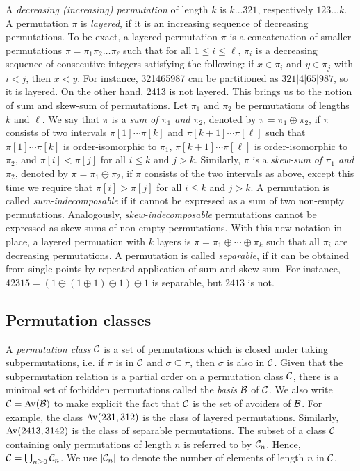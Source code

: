 \documentclass[12pt, a4paper, twoside]{report}
\begin{document}
A \emph{decreasing (increasing) permutation} of length $k$ is $k\ldots321$, respectively $123\ldots k$. A permutation $\pi$ is \emph{layered}, if it is an increasing sequence of decreasing permutations. To be exact, a layered permutation $\pi$ is a concatenation of smaller permutations $\pi= \pi_1\pi_2\ldots\pi_\ell$ such that for all $1 \leq i \leq \ell$, $\pi_i$ is a decreasing sequence of consecutive integers satisfying the following: if $x \in \pi_i$ and $y \in \pi_j$ with $i<j$, then $x<y$. For instance, 321465987 can be partitioned as $321|4|65|987$, so it is layered. On the other hand, 2413 is not layered. This brings us to the notion of sum and skew-sum of permutations. Let $\pi_1$ and $\pi_2$ be permutations of lengths $k$ and $\ell$. We say that $\pi$ is a \emph{sum of $\pi_1$ and $\pi_2$}, denoted by $\pi = \pi_1\oplus\pi_2$, if $\pi$ consists of two intervals $\pi[1]\cdots\pi[k]$ and $\pi[k+1]\cdots\pi[\ell]$ such that $\pi[1]\cdots\pi[k]$ is order-isomorphic to $\pi_1$, $\pi[k+1]\cdots\pi[\ell]$ is order-isomorphic to $\pi_2$, and $\pi[i] < \pi[j]$ for all $i\leq k$ and $j>k$. Similarly, $\pi$ is a \emph{skew-sum of $\pi_1$ and $\pi_2$}, denoted by $\pi = \pi_1\ominus \pi_2$, if $\pi$ consists of the two intervals as above, except this time we require that $\pi[i] > \pi[j]$ for all $i\leq k$ and $j > k$. A permutation is called \emph{sum-indecomposable} if it cannot be expressed as a sum of two non-empty permutations. Analogously, \emph{skew-indecomposable} permutations cannot be expressed as skew sums of non-empty permutations. With this new notation in place, a layered permuation with $k$ layers is $\pi = \pi_1\oplus\cdots\oplus \pi_k$ such that all $\pi_i$ are decreasing permutations. A permutation is called \emph{separable}, if it can be obtained from single points by repeated application of sum and skew-sum. For instance, $42315=(1\ominus (1\oplus 1)\ominus 1)\oplus 1$ is separable, but $2413$ is not.

\subsection{Permutation classes}
A \emph{permutation class} $\mathcal{C}$ is a set of permutations which is closed under taking subpermutations, i.e. if $\pi$ is in $\mathcal{C}$ and $\sigma \subseteq \pi$, then $\sigma$ is also in $\mathcal{C}$. Given that the subpermutation relation is a partial order on a permutation class $\mathcal{C}$, there is a minimal set of forbidden permutations called the \emph{basis} $\mathcal{B}$ of $\mathcal{C}$. We also write $\mathcal{C} = \mathrm{Av}(\mathcal{B})$ to make explicit the fact that $\mathcal{C}$ is the set of avoiders of $\mathcal{B}$. For example, the class $\mathrm{Av}(231,312)$ is the class of layered permutations. Similarly, $\mathrm{Av}(2413, 3142)$ is the class of separable permutations. The subset of a class $\mathcal{C}$ containing only permutations of length $n$ is referred to by $\mathcal{C}_n$. Hence, $\mathcal{C} = \bigcup_{n\geq0}\mathcal{C}_n$. We use $|\mathcal{C}_n|$ to denote the number of elements of length $n$ in $\mathcal{C}$. 
\end{document}
